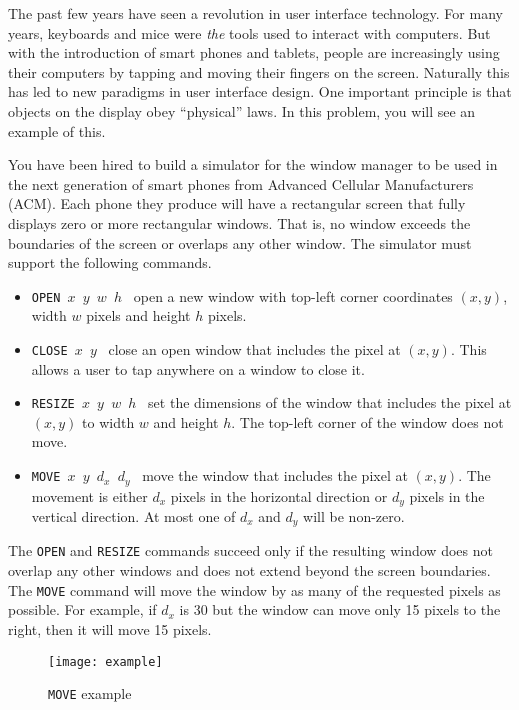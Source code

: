 
The past few years have seen a revolution in user interface
technology. For many years, keyboards and mice were \emph{the} tools used to
interact with computers. But with the introduction of smart phones and
tablets, people are increasingly using their computers by tapping and
moving their fingers on the screen.
Naturally this has led to new
paradigms in user interface design.
One important principle
is that objects on the display obey ``physical'' laws.
In this problem, you will see an example of this.

You have been hired to build a simulator for the window manager to be used
in the next generation of smart phones from Advanced Cellular
Manufacturers (ACM).
Each phone they produce will have a rectangular screen that fully displays
zero or more rectangular windows.
That is,
no window exceeds the boundaries of the screen or overlaps any other window.
The simulator must support the following commands.

\begin{itemize}
\setlength{\itemsep}{0.0in}
\item {\tt OPEN $x$ $y$ $w$ $h$}
  \textemdash\ open a new window with top-left corner
  coordinates $(x,y)$, width $w$ pixels and height $h$ pixels.
\item {\tt CLOSE $x$ $y$}
  \textemdash\ close an open window that includes the pixel at $(x,y)$.
  This allows a user to tap anywhere on a window to close it.
\item {\tt RESIZE $x$ $y$ $w$ $h$} 
  \textemdash\ set the dimensions of the window that includes the
  pixel at $(x,y)$ to width $w$ and height $h$.
  The top-left corner of the window does not move.
\item {\tt MOVE $x$ $y$ $d_x$ $d_y$}
  \textemdash\ move the window that includes the pixel at $(x,y)$.
  The movement is either $d_x$ pixels in the horizontal direction
  or $d_y$ pixels in the vertical direction.
  At most one of $d_x$ and $d_y$ will be non-zero.
\end{itemize}

The {\tt OPEN} and {\tt RESIZE} commands succeed only
if the resulting window does not overlap any other windows
and does not extend beyond the screen boundaries.
The {\tt MOVE} command will move
the window by as many of the requested pixels as possible.
For example, if $d_x$ is 30
but the window can move only 15 pixels to the right,
then it will move 15 pixels.

\begin{figure}[!b]
\centering
\texttt{[image: example]}
\caption{{\tt MOVE} example}
\label{fig:windows-example}
\end{figure}

